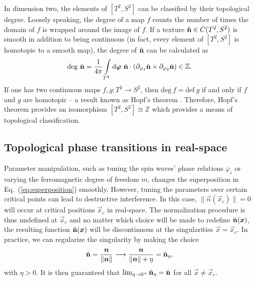 \documentclass[submission, Phys]{SciPost}
\begin{document}
In dimension two, the elements of $[T^2, S^2]$ can be classified by their topological degree.
Loosely speaking, the degree of a map $f$ counts the number of times the domain of $f$ is wrapped around the image of $f$. 
If a texture $\hat{\mathbf{n}} \in C(T^2,S^2)$ is smooth in addition to being continuous (in fact, every element of $[T^2, S^2]$ is homotopic to a smooth map), the degree of $\hat{\mathbf{n}}$ can be calculated as \cite[Thm.~17.35]{Lee2012}
\begin{align}
    \mathrm{deg}~ \hat{\mathbf{n}} = \frac{1}{4 \pi } \int\limits_{T^2} \mathrm{d} \boldsymbol{\varphi} ~\hat{\mathbf{n}} \cdot( \partial_{\varphi_1} \hat{\mathbf{n}} \times \partial_{\varphi_2} \hat{\mathbf{n}}) 
    \in \mathbb{Z}.
    \label{eq:degree}
\end{align}
If one has two continuous maps $f,g \colon T^2 \to S^2$, then $\mathrm{deg}~f = \mathrm{def}~g$ if and only if $f$ and $g$ are homotopic -- a result known as Hopf's theorem \cite[p.~51]{Milnor1965}. 
Therefore, Hopf's theorem provides an isomorphism 
$[T^2, S^2] \cong \mathbb{Z}$ which provides a means of topological classification.

\subsection{Topological phase transitions in real-space}
\label{subsec:real_space_phase_transitions}

Parameter manipulation, such as tuning the spin waves' phase relations $\varphi_i$ or varying the ferromagnetic degree of freedom $m$, changes the superposition in Eq.~(\ref{eq:superposition}) smoothly. 
However, tuning the parameters over certain critical points can lead to destructive interference.
In this case, $\| \vec{n}(\vec{x}_c) \| = 0$ will occur at critical positions $\vec{x}_c$ in real-space.
The normalization procedure is thus undefined at $\vec{x}_c$ and no matter which choice will be made to redefine $\hat{\mathbf{n}}(\boldsymbol{x})$, the resulting function $\hat{\mathbf{n}}(\boldsymbol{x})$ will be discontinuous at the singularities $\vec{x}=\vec{x}_c$.
In practice, we can regularize the singularity by making the choice
\begin{align}
    \hat{\mathbf{n}} = \frac{\boldsymbol{n}}{ \| \boldsymbol{n} \| } \longrightarrow   \frac{\boldsymbol{n}}{ \| \boldsymbol{n} \| +  \eta }  =   \hat{\mathbf{n}}_\eta ,
    \label{eq:regularize}
\end{align}
with $\eta >0 $. It is then guaranteed that $\lim_{\eta \to 0^+}\hat{\mathbf{n}}_\eta = \hat{\mathbf{n}}$ for all $\vec{x} \neq \vec{x}_c$. 
\end{document}
